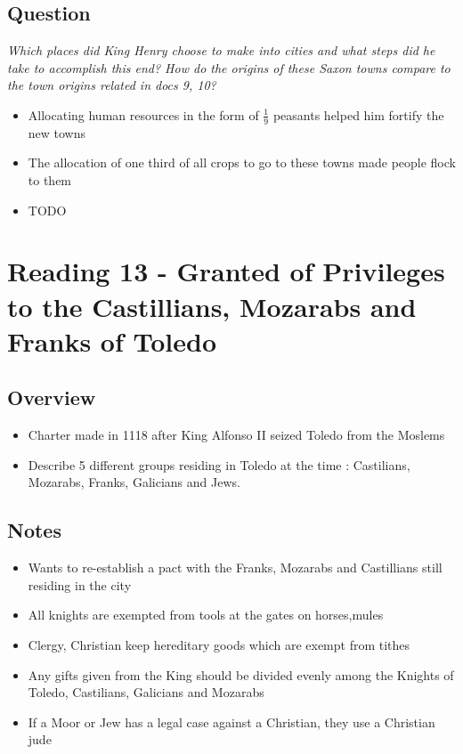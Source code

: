 \documentclass[12pt]{article}
\begin{document}
\subsection*{Question}

\textit{Which places did King Henry choose to make into cities and what steps did he take to accomplish this end? How do the origins of these Saxon towns compare to the town origins related in docs 9, 10?}

\begin{itemize}
	\item Allocating human resources in the form of $\frac{1}{9}$ peasants helped him fortify the new towns
	\item The allocation of one third of all crops to go to these towns made people flock to them
	\item TODO
\end{itemize}

\section*{Reading 13 - Granted of Privileges to the Castillians, Mozarabs and Franks of Toledo}

\subsection*{Overview}

\begin{itemize}
	\item Charter made in 1118 after King Alfonso II seized Toledo from the Moslems
	\item Describe 5 different groups residing in Toledo at the time : Castilians, Mozarabs, Franks, Galicians and Jews.
\end{itemize}

\subsection*{Notes}

\begin{itemize}
	\item Wants to re-establish a pact with the Franks, Mozarabs and Castillians still residing in the city
	\item All knights are exempted from tools at the gates on horses,mules
	\item Clergy, Christian keep hereditary goods which are exempt from tithes
	\item Any gifts given from the King should be divided evenly among the Knights of Toledo, Castilians, Galicians and Mozarabs
	\item If a Moor or Jew has a legal case against a Christian, they use a Christian jude
\end{itemize}
\end{document}
